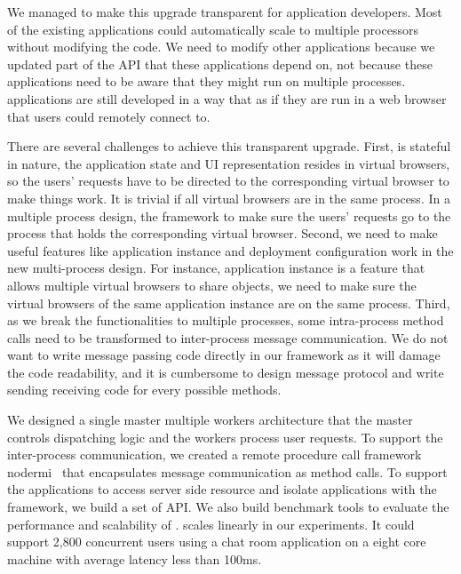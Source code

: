 We managed to make this upgrade transparent for application developers.
Most of the existing applications could automatically scale to 
multiple processors without modifying the code.
We need to modify other applications because we updated part of
the \cb{} API that these applications depend on,
not because these applications need to be aware that they might run on
multiple processes.
\cb{} applications are still developed in a way that as if they are run in
a web browser that users could remotely connect to.

There are several challenges to achieve this transparent upgrade.
First, \cb{} is stateful in nature, 
the application state and UI representation resides in virtual browsers,
so the users' requests have to be directed to the corresponding virtual browser
to make things work.
It is trivial if all virtual browsers are in the same process.
In a multiple process design,
the framework to make sure the users' requests go to the process that holds the
corresponding virtual browser.
Second, we need to make useful features like application instance and
deployment configuration work in the new multi-process design.
For instance, application instance is a feature that allows multiple virtual browsers
to share objects, we need to make sure the virtual browsers of the same application 
instance are on the same process.
Third, as we break the functionalities to multiple processes,
some intra-process method calls need to be transformed to inter-process message
communication.
We do not want to write message passing code directly in our framework as it
will damage the code readability, and it is cumbersome to design message protocol
and write sending receiving code for every possible methods.

We designed a single master multiple workers architecture that the master
controls dispatching logic and the workers process user requests.
To support the inter-process communication,
we created a remote procedure call framework nodermi~\cite{nodermi} that
encapsulates message communication as method calls.
To support the applications to access server side resource
and isolate applications with the framework,
we build a set of API. %
We also build benchmark tools to evaluate the performance and scalability of \cbtwo.
\cbtwo scales linearly in our experiments. 
It could support 2,800 concurrent users using a chat room application
on a eight core machine with average latency less than 100ms.


